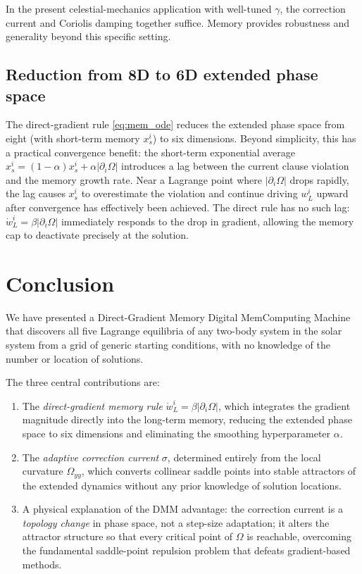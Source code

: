 \documentclass[10pt,twocolumn]{article}
\begin{document}
In the present celestial-mechanics application with well-tuned $\gamma$,
the correction current and Coriolis damping together suffice.
Memory provides robustness and generality beyond this specific setting.

\subsection{Reduction from 8D to 6D extended phase space}

The direct-gradient rule \eqref{eq:mem_ode} reduces the extended phase space
from eight (with short-term memory $x_s^i$) to six dimensions.
Beyond simplicity, this has a practical convergence benefit: the short-term
exponential average $x_s^i=(1-\alpha)x_s^i+\alpha|\partial_i\Omega|$ introduces
a lag between the current clause violation and the memory growth rate.
Near a Lagrange point where $|\partial_i\Omega|$ drops rapidly, the lag causes
$x_s^i$ to overestimate the violation and continue driving $w_L^i$ upward after
convergence has effectively been achieved.
The direct rule has no such lag: $\dot{w}_L^i=\beta|\partial_i\Omega|$
immediately responds to the drop in gradient, allowing the memory cap to
deactivate precisely at the solution.

\section{Conclusion}

We have presented a Direct-Gradient Memory Digital MemComputing Machine
that discovers all five Lagrange equilibria of any two-body system in the solar
system from a grid of generic starting conditions, with no knowledge of the
number or location of solutions.

The three central contributions are:
\begin{enumerate}
  \item The \emph{direct-gradient memory rule}
    $\dot{w}_L^i=\beta|\partial_i\Omega|$, which integrates the gradient
    magnitude directly into the long-term memory, reducing the extended phase
    space to six dimensions and eliminating the smoothing hyperparameter
    $\alpha$.
  \item The \emph{adaptive correction current} $\sigma$, determined entirely
    from the local curvature $\Omega_{yy}$, which converts collinear saddle
    points into stable attractors of the extended dynamics without any prior
    knowledge of solution locations.
  \item A physical explanation of the DMM advantage: the correction current
    is a \emph{topology change} in phase space, not a step-size adaptation;
    it alters the attractor structure so that every critical point of $\Omega$
    is reachable, overcoming the fundamental saddle-point repulsion problem
    that defeats gradient-based methods.
\end{enumerate}
\end{document}
